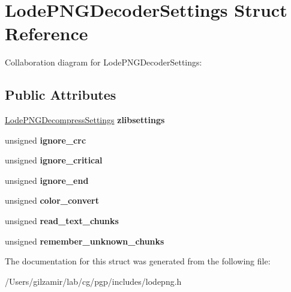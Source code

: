 \hypertarget{struct_lode_p_n_g_decoder_settings}{}\section{Lode\+P\+N\+G\+Decoder\+Settings Struct Reference}
\label{struct_lode_p_n_g_decoder_settings}


Collaboration diagram for Lode\+P\+N\+G\+Decoder\+Settings\+:
\subsection*{Public Attributes}
\begin{DoxyCompactItemize}
\item 
\mbox{\label{struct_lode_p_n_g_decoder_settings_a9ae8fef9880bef97a3e932f8ea942ed8}} 
\mbox{\hyperlink{struct_lode_p_n_g_decompress_settings}{Lode\+P\+N\+G\+Decompress\+Settings}} {\bfseries zlibsettings}
\item 
\mbox{\label{struct_lode_p_n_g_decoder_settings_a6390c403d2a5718242337bbbaf15131d}} 
unsigned {\bfseries ignore\+\_\+crc}
\item 
\mbox{\label{struct_lode_p_n_g_decoder_settings_a51c3ce791f1b1d325d5e1f7e18caeeea}} 
unsigned {\bfseries ignore\+\_\+critical}
\item 
\mbox{\label{struct_lode_p_n_g_decoder_settings_aa8f3907b3dcaf09892a752806be2fc59}} 
unsigned {\bfseries ignore\+\_\+end}
\item 
\mbox{\label{struct_lode_p_n_g_decoder_settings_af26f2b29cd338ce4476bee9571a0818a}} 
unsigned {\bfseries color\+\_\+convert}
\item 
\mbox{\label{struct_lode_p_n_g_decoder_settings_aa1212905c3f73d9fffef2c04a220d951}} 
unsigned {\bfseries read\+\_\+text\+\_\+chunks}
\item 
\mbox{\label{struct_lode_p_n_g_decoder_settings_a8775e4fc539dc457916720f52b442f27}} 
unsigned {\bfseries remember\+\_\+unknown\+\_\+chunks}
\end{DoxyCompactItemize}


The documentation for this struct was generated from the following file\+:\begin{DoxyCompactItemize}
\item 
/\+Users/gilzamir/lab/cg/pgp/includes/lodepng.\+h\end{DoxyCompactItemize}

